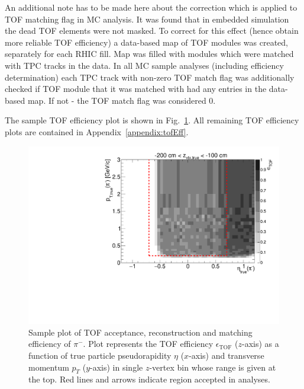 An additional note has to be made here about the correction which is applied to TOF matching flag in MC analysis. It was found that in embedded simulation the dead TOF elements were not masked. To correct for this effect (hence obtain more reliable TOF efficiency) a data-based map of TOF modules was created, separately for each RHIC fill. Map was filled with modules which were matched with TPC tracks in the data. In all MC sample analyses (including efficiency determination) each TPC track with non-zero TOF match flag was additionally checked if TOF module that it was matched with had any entries in the data-based map. If not - the TOF match flag was considered 0.

The sample TOF efficiency plot is shown in Fig.~\ref{fig:tofEff_pion_sample}. All remaining TOF efficiency plots are contained in Appendix~\ref{appendix:tofEff}.

\begin{figure}[hb]%
\centering\includegraphics[width=0.7\linewidth,page=11]{graphics/eff/Eff2D_TOF_pion_Minus.pdf}%
\caption[Sample plot of TOF acceptance, reconstruction and matching efficiency of $\pi^{-}$.]{Sample plot of TOF acceptance, reconstruction and matching efficiency of $\pi^{-}$. Plot represents the TOF efficiency $\epsilon_{\text{TOF}}$ ($z$-axis) as a function of true particle pseudorapidity $\eta$ ($x$-axis) and transverse momentum $p_{T}$ ($y$-axis) in single $z$-vertex bin whose range is given at the top. Red lines and arrows indicate region accepted in analyses.}\label{fig:tofEff_pion_sample}
\end{figure}

% 
% 
